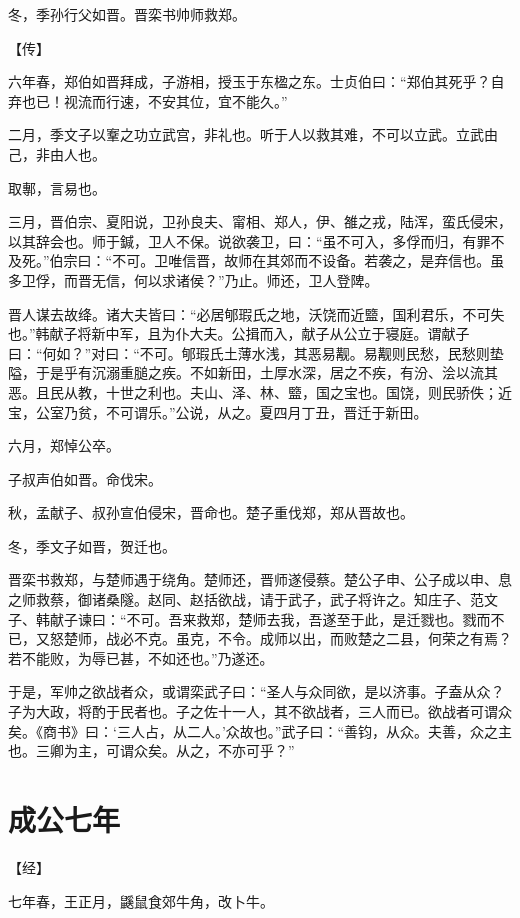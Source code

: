 \documentclass[a4paper,12pt,UTF8,twoside]{ctexbook}
\begin{document}
冬，季孙行父如晋。晋栾书帅师救郑。

【传】

六年春，郑伯如晋拜成，子游相，授玉于东楹之东。士贞伯曰：“郑伯其死乎？自弃也已！视流而行速，不安其位，宜不能久。”

二月，季文子以鞌之功立武宫，非礼也。听于人以救其难，不可以立武。立武由己，非由人也。

取鄟，言易也。

三月，晋伯宗、夏阳说，卫孙良夫、甯相、郑人，伊、雒之戎，陆浑，蛮氏侵宋，以其辞会也。师于鍼，卫人不保。说欲袭卫，曰：“虽不可入，多俘而归，有罪不及死。”伯宗曰：“不可。卫唯信晋，故师在其郊而不设备。若袭之，是弃信也。虽多卫俘，而晋无信，何以求诸侯？”乃止。师还，卫人登陴。

晋人谋去故绛。诸大夫皆曰：“必居郇瑕氏之地，沃饶而近盬，国利君乐，不可失也。”韩献子将新中军，且为仆大夫。公揖而入，献子从公立于寝庭。谓献子曰：“何如？”对曰：“不可。郇瑕氏土薄水浅，其恶易觏。易觏则民愁，民愁则垫隘，于是乎有沉溺重膇之疾。不如新田，土厚水深，居之不疾，有汾、浍以流其恶。且民从教，十世之利也。夫山、泽、林、盬，国之宝也。国饶，则民骄佚；近宝，公室乃贫，不可谓乐。”公说，从之。夏四月丁丑，晋迁于新田。

六月，郑悼公卒。

子叔声伯如晋。命伐宋。



秋，孟献子、叔孙宣伯侵宋，晋命也。楚子重伐郑，郑从晋故也。

冬，季文子如晋，贺迁也。

晋栾书救郑，与楚师遇于绕角。楚师还，晋师遂侵蔡。楚公子申、公子成以申、息之师救蔡，御诸桑隧。赵同、赵括欲战，请于武子，武子将许之。知庄子、范文子、韩献子谏曰：“不可。吾来救郑，楚师去我，吾遂至于此，是迁戮也。戮而不已，又怒楚师，战必不克。虽克，不令。成师以出，而败楚之二县，何荣之有焉？若不能败，为辱已甚，不如还也。”乃遂还。

于是，军帅之欲战者众，或谓栾武子曰：“圣人与众同欲，是以济事。子盍从众？子为大政，将酌于民者也。子之佐十一人，其不欲战者，三人而已。欲战者可谓众矣。《商书》曰：‘三人占，从二人。’众故也。”武子曰：“善钧，从众。夫善，众之主也。三卿为主，可谓众矣。从之，不亦可乎？”


\section{成公七年}



【经】

七年春，王正月，鼷鼠食郊牛角，改卜牛。
\end{document}
